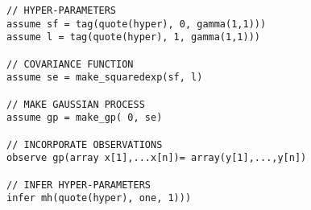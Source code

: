 \begin{mdframed}
\begin{minipage}{\linewidth}
\small
\belowcaptionskip=-10pt
\begin{lstlisting}[mathescape,label=alg:gpNeal,basicstyle=\selectfont\ttfamily,numbers=none]
// HYPER-PARAMETERS
assume sf = tag(quote(hyper), 0, gamma(1,1)))
assume l = tag(quote(hyper), 1, gamma(1,1)))

// COVARIANCE FUNCTION
assume se = make_squaredexp(sf, l)

// MAKE GAUSSIAN PROCESS
assume gp = make_gp( 0, se)

// INCORPORATE OBSERVATIONS
observe gp(array x[1],...x[n])= array(y[1],...,y[n])

// INFER HYPER-PARAMETERS
infer mh(quote(hyper), one, 1)))
\end{lstlisting}
\end{minipage}
\end{mdframed}